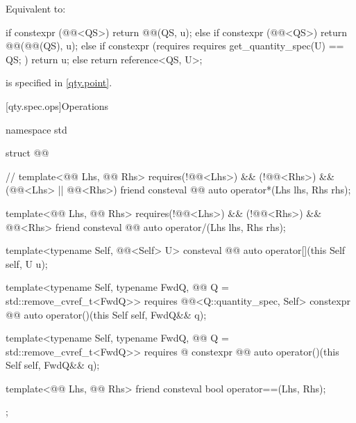 \begin{itemdescr}
\pnum
\effects
Equivalent to:
\begin{codeblock}
if constexpr (@@<QS>)
  return @@(QS{}, u);
else if constexpr (@@<QS>)
  return @@(@@(QS{}), u);
else if constexpr (requires { requires get_quantity_spec(U{}) == QS{}; })
  return u;
else
  return reference<QS, U>{};
\end{codeblock}
\begin{note}
 is specified in \ref{qty.point}.
\end{note}
\end{itemdescr}

[qty.spec.ops]{Operations}

\begin{codeblock}
namespace std {

struct @@ {  // \expos
  template<@@ Lhs, @@ Rhs>
    requires(!@@<Lhs>) && (!@@<Rhs>) &&
            (@@<Lhs> || @@<Rhs>)
  friend consteval @@ auto operator*(Lhs lhs, Rhs rhs);

  template<@@ Lhs, @@ Rhs>
    requires(!@@<Lhs>) && (!@@<Rhs>) &&
            @@<Rhs>
  friend consteval @@ auto operator/(Lhs lhs, Rhs rhs);

  template<typename Self, @@<Self{}> U>
  consteval @@ auto operator[](this Self self, U u);

  template<typename Self, typename FwdQ, @@ Q = std::remove_cvref_t<FwdQ>>
    requires @@<Q::quantity_spec, Self{}>
  constexpr @@ auto operator()(this Self self, FwdQ&& q);

  template<typename Self, typename FwdQ, @@ Q = std::remove_cvref_t<FwdQ>>
    requires @\seebelownc@
  constexpr @@ auto operator()(this Self self, FwdQ&& q);

  template<@@ Lhs, @@ Rhs>
  friend consteval bool operator==(Lhs, Rhs);
};

}
\end{codeblock}

